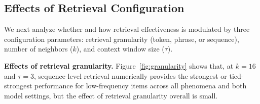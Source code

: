 \subsection{Effects of Retrieval Configuration}
\label{sec:retrieval_configuration}

We next analyze whether and how retrieval effectiveness is modulated by three configuration parameters: retrieval granularity (token, phrase, or sequence), number of neighbors ($k$), and context window size ($\tau$). 


\noindent \textbf{Effects of retrieval granularity.}
Figure~\ref{fig:granularity} shows that, at $k=16$ and $\tau=3$, sequence-level retrieval numerically provides the strongest or tied-strongest performance for low-frequency items across all phenomena and both model settings, but the effect of retrieval granularity overall is small. 


